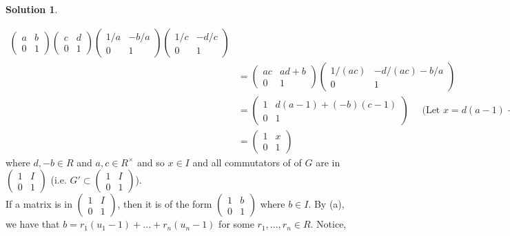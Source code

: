 \documentclass[10pt]{article}
\theoremstyle{Theorem}
\theoremstyle{definition}
\newtheorem{sol}{Solution}
\theoremstyle{remark}
\theoremstyle{custom}
\begin{document}
\begin{sol}
\begin{description}
\begin{align*}
  (\begin{smallmatrix}a&b\\0&1\end{smallmatrix})(\begin{smallmatrix}c&d\\0&1\end{smallmatrix})(\begin{smallmatrix}1/a&-b/a\\0&1\end{smallmatrix})(\begin{smallmatrix}1/c&-d/c\\0&1\end{smallmatrix}) \\
&=  (\begin{smallmatrix}ac&ad+b\\0&1\end{smallmatrix})(\begin{smallmatrix}1/(ac)&-d/(ac)-b/a\\0&1\end{smallmatrix})  \\
&=  (\begin{smallmatrix}1&d(a-1)+(-b)(c-1)\\0&1\end{smallmatrix}) \mbox{~~~~(Let } x=d(a-1)+(-b)(c-1).)\\ 
&= (\begin{smallmatrix}1&x\\0&1\end{smallmatrix})
\end{align*}
where $d,-b\in R$ and $a,c\in R^\times$ and so $x\in I$ and all commutators of of $G$ are in $(\begin{smallmatrix}1&I\\0&1\end{smallmatrix})$ (i.e. $G'\subset (\begin{smallmatrix}1&I\\0&1\end{smallmatrix})$). \\
If a  matrix is in $(\begin{smallmatrix}1&I\\0&1\end{smallmatrix})$, then it is of the form $(\begin{smallmatrix}1&b\\0&1\end{smallmatrix})$ where $b\in I$. By (a), we have that $b=r_1(u_1-1)+...+r_n(u_n-1)$ for some $r_1,...,r_n\in R$. Notice, 
\begin{align*}

\end{align*}
\end{description}
\end{sol}
\end{document}
